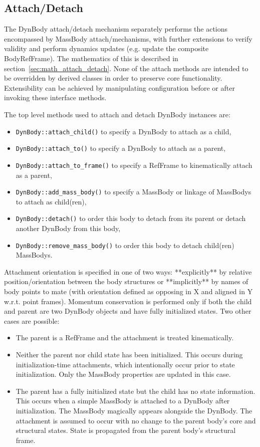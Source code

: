 \subsection{Attach/Detach}\label{sec:detailed_attach_detach}
The DynBody attach/detach mechanism separately performs the actions encompassed 
by MassBody attach/mechanisms, with further extensions to verify validity and 
perform dynamics updates (e.g. update the composite BodyRefFrame). The mathematics
of this is described in section~\ref{sec:math_attach_detach}. None of the 
attach methods are intended to be overridden by derived classes in order to 
preserve core functionality. Extensibility can be achieved by manipulating 
configuration before or after invoking these interface methods.

The top level methods used to attach and detach DynBody instances are: \begin{itemize}
\item \verb+DynBody::attach_child()+ to specify a DynBody to attach as a child, 
\item \verb+DynBody::attach_to()+ to specify a DynBody to attach as a parent, 
\item \verb+DynBody::attach_to_frame()+ to specify a RefFrame to kinematically attach as a parent, 
\item \verb+DynBody::add_mass_body()+ to specify a MassBody or linkage of 
    MassBodys to attach as child(ren), 
\item \verb+DynBody::detach()+ to order this body to detach from its parent 
    or detach another DynBody from this body,
\item \verb+DynBody::remove_mass_body()+ to order this body to detach child(ren) 
    MassBodys. 
\end{itemize}

Attachment orientation is specified in one of two ways: **explicitly** by 
relative position/orientation between the body structures or **implicitly** by 
names of body points to mate (with orientation defined as opposing in X and 
aligned in Y w.r.t. point frames). 
Momentum conservation is performed only if both the child and parent are two DynBody objects and 
have fully initialized states. Two other cases are possible:
\begin{itemize}
\item The parent is a RefFrame and the attachment is treated kinematically.
\item Neither the parent nor child state has been initialized. This occurs
during initialization-time attachments, which intentionally occur prior
to state initialization. Only the MassBody properties are updated in this case.
\item The parent has a fully initialized state but the child has no state
information. This occurs when a simple MassBody is attached to a DynBody
after initialization. The MassBody magically appears alongside the
DynBody. The attachment is assumed to occur with no change to the parent
body's core and structural states. State is propagated from the parent
body's structural frame.
\end{itemize}

